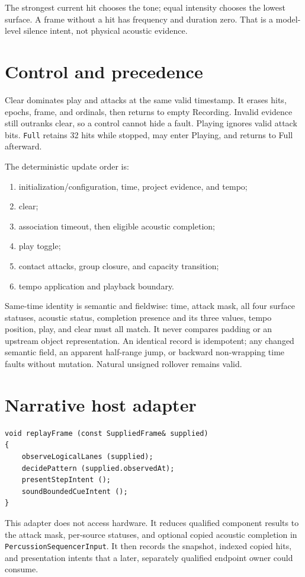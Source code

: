 \documentclass[11pt]{article}
\begin{document}
The strongest current hit chooses the tone; equal intensity chooses the
lowest surface. A frame without a hit has frequency and duration zero. That is
a model-level silence intent, not physical acoustic evidence.

\section{Control and precedence}
Clear dominates play and attacks at the same valid timestamp. It erases hits,
epochs, frame, and ordinals, then returns to empty Recording. Invalid evidence
still outranks clear, so a control cannot hide a fault. Playing ignores valid
attack bits. \texttt{Full} retains 32 hits while stopped, may enter Playing,
and returns to Full afterward.

The deterministic update order is:
\begin{enumerate}
 \item initialization/configuration, time, project evidence, and tempo;
 \item clear;
 \item association timeout, then eligible acoustic completion;
 \item play toggle;
 \item contact attacks, group closure, and capacity transition;
 \item tempo application and playback boundary.
\end{enumerate}
Same-time identity is semantic and fieldwise: time, attack mask, all four
surface statuses, acoustic status, completion presence and its three values,
tempo position, play, and clear must all match. It never compares padding or
an upstream object representation. An identical record is idempotent; any
changed semantic field, an apparent half-range jump, or backward non-wrapping
time faults without mutation. Natural unsigned rollover remains valid.

\section{Narrative host adapter}
\begin{lstlisting}[style=adkcpp]
void replayFrame (const SuppliedFrame& supplied)
{
    observeLogicalLanes (supplied);
    decidePattern (supplied.observedAt);
    presentStepIntent ();
    soundBoundedCueIntent ();
}
\end{lstlisting}
This adapter does not access hardware. It reduces qualified component results
to the attack mask, per-source statuses, and optional copied acoustic
completion in \texttt{PercussionSequencerInput}. It then records the snapshot,
indexed copied hits, and presentation intents that a later, separately
qualified endpoint owner could consume.
\end{document}
